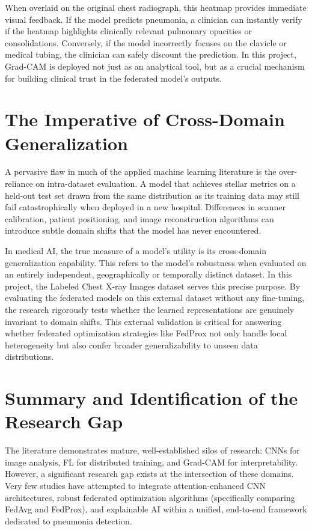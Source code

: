 \documentclass[12pt,a4paper]{report}
\begin{document}
When overlaid on the original chest radiograph, this heatmap provides immediate visual feedback. If the model predicts pneumonia, a clinician can instantly verify if the heatmap highlights clinically relevant pulmonary opacities or consolidations. Conversely, if the model incorrectly focuses on the clavicle or medical tubing, the clinician can safely discount the prediction. In this project, Grad-CAM is deployed not just as an analytical tool, but as a crucial mechanism for building clinical trust in the federated model's outputs.

\section{The Imperative of Cross-Domain Generalization}

A pervasive flaw in much of the applied machine learning literature is the over-reliance on intra-dataset evaluation. A model that achieves stellar metrics on a held-out test set drawn from the same distribution as its training data may still fail catastrophically when deployed in a new hospital. Differences in scanner calibration, patient positioning, and image reconstruction algorithms can introduce subtle domain shifts that the model has never encountered.

In medical AI, the true measure of a model's utility is its cross-domain generalization capability. This refers to the model's robustness when evaluated on an entirely independent, geographically or temporally distinct dataset. In this project, the Labeled Chest X-ray Images dataset serves this precise purpose. By evaluating the federated models on this external dataset without any fine-tuning, the research rigorously tests whether the learned representations are genuinely invariant to domain shifts. This external validation is critical for answering whether federated optimization strategies like FedProx not only handle local heterogeneity but also confer broader generalizability to unseen data distributions.

\section{Summary and Identification of the Research Gap}

The literature demonstrates mature, well-established silos of research: CNNs for image analysis, FL for distributed training, and Grad-CAM for interpretability. However, a significant research gap exists at the intersection of these domains. Very few studies have attempted to integrate attention-enhanced CNN architectures, robust federated optimization algorithms (specifically comparing FedAvg and FedProx), and explainable AI within a unified, end-to-end framework dedicated to pneumonia detection. 
\end{document}
